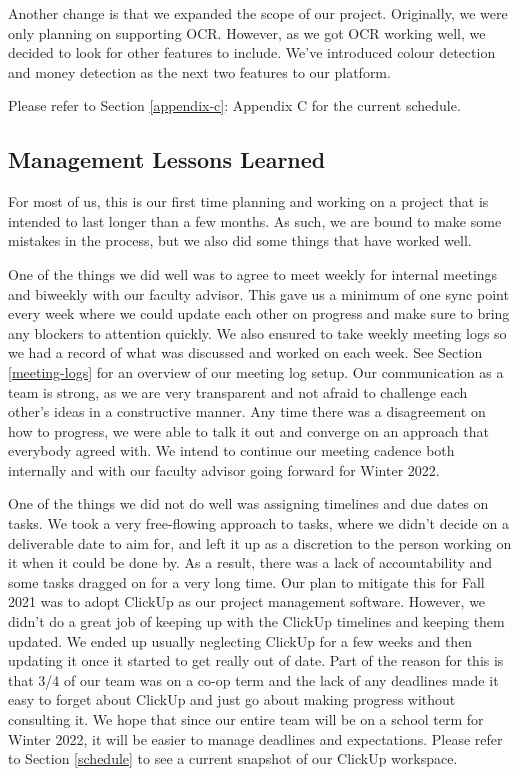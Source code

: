 \documentclass[a4paper,11pt]{article}
\begin{document}
Another change is that we expanded the scope of our project. Originally, we were only planning on supporting OCR. However, as we got OCR working well, we decided to look for other features to include. We've introduced colour detection and money detection as the next two features to our platform.

Please refer to Section \ref{appendix-c}: Appendix C for the current schedule.

\subsection{Management Lessons Learned}
For most of us, this is our first time planning and working on a project that is intended to last longer than a few months. As such, we are bound to make some mistakes in the process, but we also did some things that have worked well.

One of the things we did well was to agree to meet weekly for internal meetings and biweekly with our faculty advisor. This gave us a minimum of one sync point every week where we could update each other on progress and make sure to bring any blockers to attention quickly. We also ensured to take weekly meeting logs so we had a record of what was discussed and worked on each week. See Section \ref{meeting-logs} for an overview of our meeting log setup. Our communication as a team is strong, as we are very transparent and not afraid to challenge each other's ideas in a constructive manner. Any time there was a disagreement on how to progress, we were able to talk it out and converge on an approach that everybody agreed with. We intend to continue our meeting cadence both internally and with our faculty advisor going forward for Winter 2022.

One of the things we did not do well was assigning timelines and due dates on tasks. We took a very free-flowing approach to tasks, where we didn't decide on a deliverable date to aim for, and left it up as a discretion to the person working on it when it could be done by. As a result, there was a lack of accountability and some tasks dragged on for a very long time. Our plan to mitigate this for Fall 2021 was to adopt ClickUp as our project management software. However, we didn't do a great job of keeping up with the ClickUp timelines and keeping them updated. We ended up usually neglecting ClickUp for a few weeks and then updating it once it started to get really out of date. Part of the reason for this is that 3/4 of our team was on a co-op term and the lack of any deadlines made it easy to forget about ClickUp and just go about making progress without consulting it. We hope that since our entire team will be on a school term for Winter 2022, it will be easier to manage deadlines and expectations. Please refer to Section \ref{schedule} to see a current snapshot of our ClickUp workspace.
\end{document}
